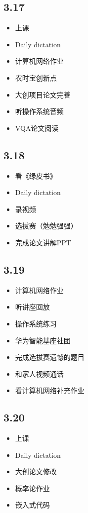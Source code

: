 \documentclass[UTF8]{ctexart}
\begin{document}
\subsection*{3.17}
\begin{itemize}
    \item 上课
    \item Daily dictation
    \item 计算机网络作业
    \item 农时宝创新点
    \item 大创项目论文完善
    \item 听操作系统音频
    \item VQA论文阅读
\end{itemize}
\subsection*{3.18}
\begin{itemize}
    \item 看《绿皮书》
    \item Daily dictation
    \item 录视频
    \item 选拔赛（勉勉强强）
    \item 完成论文讲解PPT
\end{itemize}
\subsection*{3.19}
\begin{itemize}
    \item 计算机网络作业
    \item 听讲座回放
    \item 操作系统练习
    \item 华为智能基座社团
    \item 完成选拔赛遗憾的题目
    \item 和家人视频通话
    \item 看计算机网络补充作业
\end{itemize}
\subsection*{3.20}
\begin{itemize}
    \item 上课
    \item Daily dictation
    \item 大创论文修改
    \item 概率论作业
    \item 嵌入式代码
\end{itemize}
\end{document}
